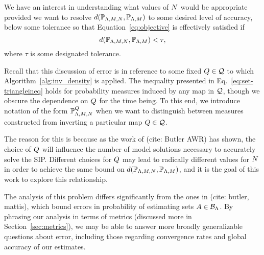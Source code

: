 We have an interest in understanding what values of $N$ would be appropriate provided we want to resolve $d(\mathbb{P}_{{\Lambda}, M, N}, \mathbb{P}_{{\Lambda}, M})$ to some desired level of accuracy, below some tolerance so that Equation~\eqref{eq:objective} is effectively satisfied if
\begin{equation}\label{eq:newobjective}
d(\mathbb{P}_{{\Lambda}, M, N}, \mathbb{P}_{{\Lambda},M}) < \tau,
\end{equation}
where $\tau$ is some designated tolerance.

Recall that this discussion of error is in reference to some fixed $Q\in\mathcal{Q}$ to which Algorithm~\ref{alg:inv_density} is applied.
The inequality presented in Eq.~\eqref{eq:set-triangleineq} holds for probability measures induced by any map in $\mathcal{Q}$, though we obscure the dependence on $Q$ for the time being.
To this end, we introduce notation of the form $\mathbb{P}_{{\Lambda}, M, N}^{Q}$ when we want to distinguish between measures constructed from inverting a particular map $Q\in\mathcal{Q}$.

The reason for this is because as the work of (cite: Butler AWR) has shown, the choice of $Q$ will influence the number of model solutions necessary to accurately solve the SIP.
Different choices for $Q$ may lead to radically different values for $N$ in order to achieve the same bound on $d(\mathbb{P}_{{\Lambda}, M, N}, \mathbb{P}_{{\Lambda}, M})$, and it is the goal of this work to explore this relationship.

The analysis of this problem differs significantly from the ones in (cite: butler, mattis), which bound errors in probability of estimating sets $A\in\mathcal{B}_{{\Lambda}}$.
By phrasing our analysis in terms of metrics (discussed more in Section~\ref{sec:metrics}), we may be able to answer more broadly generalizable questions about error, including those regarding convergence rates and global accuracy of our estimates.



\FloatBarrier


\FloatBarrier
